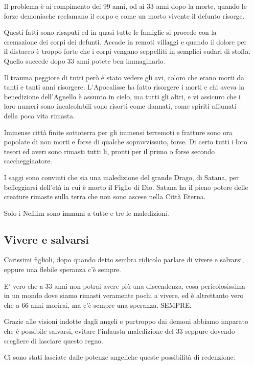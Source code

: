 \documentclass[12pt,a4paper,twoside,openany]{book}
\begin{document}
\begin{multicols}{2}
Il problema è ai compimento dei 99 anni, od ai 33 anni dopo la morte, quando le forze demoniache reclamano il corpo e come un morto vivente il defunto risorge.

Questi fatti sono risaputi ed in quasi tutte le famiglie si procede con la cremazione dei corpi dei defunti. Accade in remoti villaggi e quando il dolore per il distacco è troppo forte che i corpi vengano seppelliti in semplici sudari di stoffa. Quello succede dopo 33 anni potete ben immaginarlo.

Il trauma peggiore di tutti però è stato vedere gli avi, coloro che erano morti da tanti e tanti anni risorgere. L'Apocalisse ha fatto risorgere i morti e chi aveva la benedizione dell'Agnello è assunto in cielo, ma tutti gli altri, e vi assicuro che i loro numeri sono incalcolabili sono risorti come dannati, come spiriti affamati della poca vita rimasta.

Immense città finite sottoterra per gli immensi terremoti e fratture sono ora popolate di non morti e forse di qualche sopravvissuto, forse. Di certo tutti i loro tesori ed averi sono rimasti tutti li, pronti per il primo o forse secondo saccheggiaatore.

I saggi sono convinti che sia una maledizione del grande Drago, di Satana, per beffeggiarsi dell'età in cui è morto il Figlio di Dio. 
Satana ha il pieno potere delle creature rimaste sulla terra che non sono ascese nella Città Eterna.

Solo i Nefilim sono immuni a tutte e tre le maledizioni.

\subsection{Vivere e salvarsi}

Carissimi figlioli, dopo quando detto sembra ridicolo parlare di vivere e salvarsi, eppure una flebile speranza c'è sempre.

E' vero che a 33 anni non potrai avere più una discendenza, cosa pericolosissima in un mondo dove siamo rimasti veramente pochi a vivere, ed è altrettanto vero che a 66 anni morirai, ma c'è sempre una speranza. SEMPRE.

Grazie alle visioni indotte dagli angeli e purtroppo dai demoni abbiamo imparato che è possibile salvarsi, evitare l'infausta maledizione del 33 seppure dovendo scegliere di lasciare questo regno.

Ci sono stati lasciate dalle potenze angeliche queste possibilità di redenzione:


\end{multicols}
\end{document}
